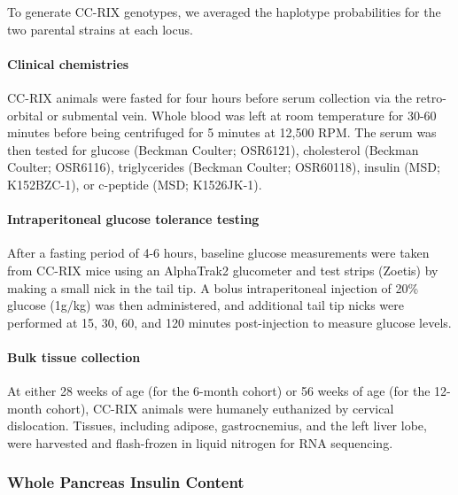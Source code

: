 \documentclass[
]{article}
\begin{document}
To generate CC-RIX genotypes, we averaged the haplotype probabilities
for the two parental strains at each locus.

\paragraph{Clinical chemistries}\label{clinical-chemistries}

CC-RIX animals were fasted for four hours before serum collection via
the retro-orbital or submental vein. Whole blood was left at room
temperature for 30-60 minutes before being centrifuged for 5 minutes at
12,500 RPM. The serum was then tested for glucose (Beckman Coulter;
OSR6121), cholesterol (Beckman Coulter; OSR6116), triglycerides (Beckman
Coulter; OSR60118), insulin (MSD; K152BZC-1), or c-peptide (MSD;
K1526JK-1).

\paragraph{Intraperitoneal glucose tolerance
testing}\label{intraperitoneal-glucose-tolerance-testing}

After a fasting period of 4-6 hours, baseline glucose measurements were
taken from CC-RIX mice using an AlphaTrak2 glucometer and test strips
(Zoetis) by making a small nick in the tail tip. A bolus intraperitoneal
injection of 20\% glucose (1g/kg) was then administered, and additional
tail tip nicks were performed at 15, 30, 60, and 120 minutes
post-injection to measure glucose levels.

\paragraph{Bulk tissue collection}\label{bulk-tissue-collection}

At either 28 weeks of age (for the 6-month cohort) or 56 weeks of age
(for the 12-month cohort), CC-RIX animals were humanely euthanized by
cervical dislocation. Tissues, including adipose, gastrocnemius, and the
left liver lobe, were harvested and flash-frozen in liquid nitrogen for
RNA sequencing.

\subsubsection{Whole Pancreas Insulin
Content}\label{whole-pancreas-insulin-content}
\end{document}
